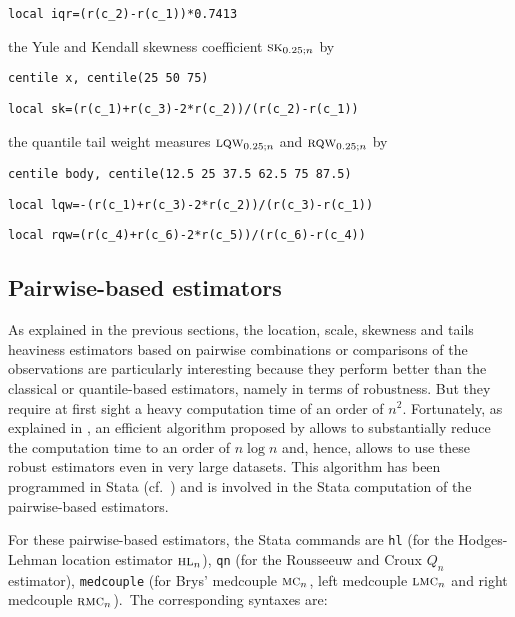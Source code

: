 \texttt{local iqr=(r(c\_2)-r(c\_1))*0.7413}

\begin{description}
\item the Yule and Kendall skewness coefficient $\stsc{SK}_{0.25;n}$ by
\end{description}

\texttt{centile x, centile(25 50 75)}

\texttt{local sk=(r(c\_1)+r(c\_3)-2*r(c\_2))/(r(c\_2)-r(c\_1))}

\begin{description}
\item the quantile tail weight measures $\stsc{LQW}_{0.25;n}$ and
$\stsc{RQW}_{0.25;n}$ by
\end{description}

\texttt{centile body, centile(12.5 25 37.5 62.5 75 87.5)}

\texttt{local lqw=-(r(c\_1)+r(c\_3)-2*r(c\_2))/(r(c\_3)-r(c\_1))}

\texttt{local rqw=(r(c\_4)+r(c\_6)-2*r(c\_5))/(r(c\_6)-r(c\_4))}

\subsection{Pairwise-based estimators}

As explained in the previous sections, the location, scale, skewness and tails
heaviness estimators based on pairwise combinations or comparisons of the
observations are particularly interesting because they perform better than the
classical or quantile-based estimators, namely in terms of robustness. But
they require at first sight a heavy computation time of an order of $n^2$.
Fortunately, as explained in \citet{croux:rousseeuw:1992}, an efficient
algorithm proposed by \citet{johnson:mizoguchi:1978} allows to substantially reduce the computation time to an order of
$n\log n$ and, hence, allows to use these robust estimators even in very large
datasets. This algorithm has been programmed in Stata (cf.\
\citealp{gelade:verardi:vermandele:2015}) and is involved in the Stata
computation of the pairwise-based estimators.

For these pairwise-based estimators, the Stata commands are \texttt{hl} (for
the Hodges-Lehman location estimator $\stsc{HL}_n$), \texttt{qn} (for the
Rousseeuw and Croux $Q_n$ estimator), \texttt{medcouple} (for Brys'
medcouple $\stsc{MC}_n$, left medcouple $\stsc{LMC}_n$ and right
medcouple $\stsc{RMC}_n$).\ The corresponding syntaxes are:

